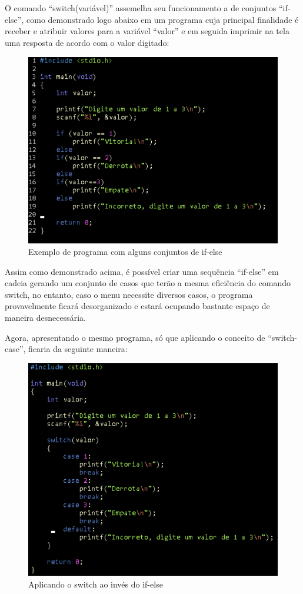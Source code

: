\documentclass[a4paper,12pt]{article}  %
\begin{document}
   O comando “switch(variável)” assemelha seu funcionamento a de conjuntos “if-else”, como demonstrado logo abaixo em um programa cuja principal finalidade é receber e atribuir valores para a variável “valor” e em seguida imprimir na tela uma resposta de acordo com o valor digitado: 

 \begin{figure}[H]
 \centering
 \includegraphics[width=.80\linewidth]{imagens/ex2.png}
 \caption{Exemplo de programa com alguns conjuntos de if-else}
 \label{fig:xsorta}
\end{figure}

   Assim como demonstrado acima, é possível criar uma sequência “if-else” em cadeia gerando um conjunto de casos que terão a mesma eficiência do comando switch, no entanto, caso o menu necessite diversos casos, o programa provavelmente ficará desorganizado e estará ocupando bastante espaço de maneira desnecessária. \par
   

    Agora, apresentando o mesmo programa, só que aplicando o conceito de “switch-case”, ficaria da seguinte maneira:

\begin{figure}[H]
 \centering
 \includegraphics[width=.80\linewidth]{imagens/ex3.png}
 \caption{Aplicando o switch ao invés do if-else}
\end{figure}
\end{document}
